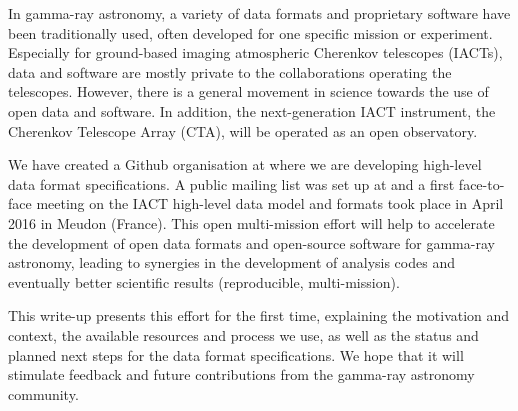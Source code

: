 In gamma-ray astronomy, a variety of data formats and proprietary software have been traditionally used, often developed for one specific mission or experiment. Especially for ground-based imaging atmospheric Cherenkov telescopes (IACTs), data and software are mostly private to the collaborations operating the telescopes. However, there is a general movement in science towards the use of open data and software. In addition, the next-generation IACT instrument, the Cherenkov Telescope Array (CTA), will be operated as an open observatory.

We have created a Github organisation at \ogragithub where we are developing high-level data format specifications. A public mailing list was set up at \ogralist and a first face-to-face meeting on the IACT high-level data model and formats took place in April 2016 in Meudon (France). This open multi-mission effort will help to accelerate the development of open data formats and open-source software for gamma-ray astronomy, leading to synergies in the development of analysis codes and eventually better scientific results (reproducible, multi-mission).

This write-up presents this effort for the first time, explaining the motivation and context, the available resources and process we use, as well as the status and planned next steps for the data format specifications. We hope that it will stimulate feedback and future contributions from the gamma-ray astronomy community.
